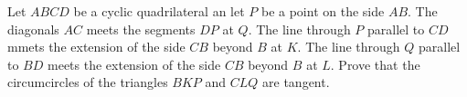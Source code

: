 Let $ABCD$ be a cyclic quadrilateral an let $P$ be a point on the side $AB$.
The diagonals $AC$ meets the segments $DP$ at $Q$.
The line through $P$ parallel to $CD$ mmets the extension of the side $CB$ beyond $B$ at $K$.
The line through $Q$ parallel to $BD$ meets the extension of the side $CB$ beyond $B$ at $L$.
Prove that the circumcircles of the triangles $BKP$ and $CLQ$ are tangent.
